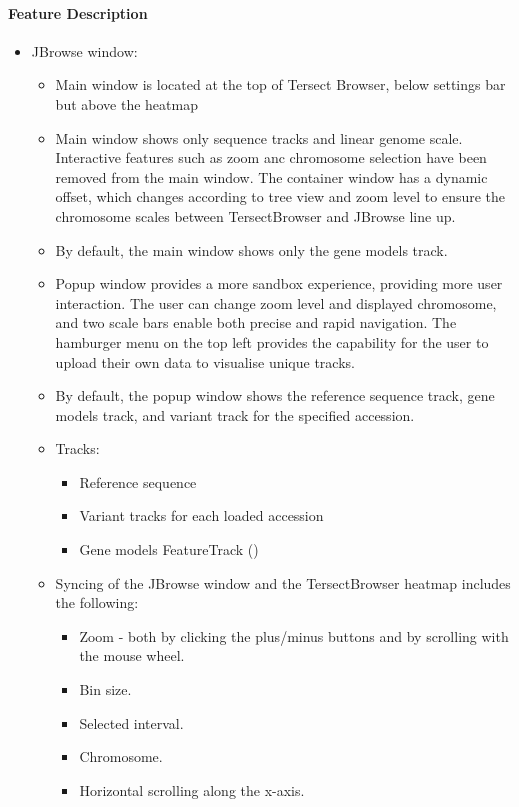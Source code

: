 \documentclass[12pt]{article}
\begin{document}
\paragraph{Feature Description}
\begin{itemize}
    \item JBrowse window:
    \begin{itemize}
        \item Main window is located at the top of Tersect Browser, below settings bar but above the heatmap 
        \item Main window shows only sequence tracks and linear genome scale. Interactive features such as zoom anc chromosome selection have been removed from the main window. The container window has a dynamic offset, which changes according to tree view and zoom level to ensure the chromosome scales between TersectBrowser and JBrowse line up. 
        \item By default, the main window shows only the gene models track.
        \item Popup window provides a more sandbox experience, providing more user interaction. The user can change zoom level and displayed chromosome, and two scale bars enable both precise and rapid navigation. The hamburger menu on the top left provides the capability for the user to upload their own data to visualise unique tracks.
        \item By default, the popup window shows the reference sequence track, gene models track, and variant track for the specified accession.
    \item Tracks:
    \begin{itemize}
        \item Reference sequence 
        \item Variant tracks for each loaded accession
        \item Gene models FeatureTrack ()
    \end{itemize}
    \item Syncing of the JBrowse window and the TersectBrowser heatmap includes the following:
    \begin{itemize}
        \item Zoom - both by clicking the plus/minus buttons and by scrolling with the mouse wheel.
        \item Bin size.
        \item Selected interval.
        \item Chromosome.
        \item Horizontal scrolling along the x-axis.
    \end{itemize}
\end{itemize}
\end{itemize}
    
\end{document}

